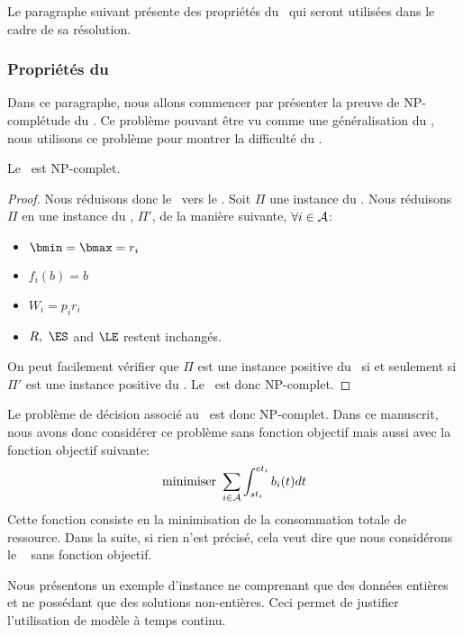 Le paragraphe suivant présente des propriétés du \CECSP~qui seront 
utilisées dans le cadre de sa résolution. 

\subsubsection{Propriétés du \CECSP}

Dans ce paragraphe, nous allons commencer par présenter la preuve de
NP-complétude du \CECSP. Ce problème pouvant être vu comme une
généralisation du \CUSP, nous utilisons ce problème pour montrer la
difficulté du \CECSP. 

\begin{theo}
Le \CECSP~est NP-complet.
\end{theo}

\begin{proof}
Nous réduisons donc le \CUSP~vers le \CECSP. Soit $\Pi$ une instance
du \CUSP. Nous réduisons $\Pi$ en une instance du \CECSP, $\Pi'$, de
la manière suivante, $\forall i \in {\cal A}$:
\begin{itemize}
\item $ \bmin=\bmax=r_i$
\item $f_i(b)=b$
\item $W_i=p_ir_i$
\item $R,\ \ES$ and $\LE$ restent inchangés. 
\end{itemize}

On peut facilement vérifier  que $\Pi$ est une instance positive du \CUSP~si
et seulement si $\Pi'$ est une instance positive du \CECSP. Le
\CECSP~est donc NP-complet.
\end{proof}

Le problème de décision associé au \CECSP~est donc NP-complet. Dans ce
manuscrit, nous avons donc considérer ce problème sans fonction
objectif mais aussi avec la fonction objectif suivante: 
\[\text{minimiser } \sum_{i \in {\cal A}} \int_{st_i}^{et_i} b_i(t)dt\]
Cette fonction consiste en la minimisation de la consommation totale
de ressource. Dans la suite, si rien n'est précisé, cela veut dire que
nous considérons le \CECSP~ sans fonction objectif.

Nous présentons un exemple d'instance ne comprenant que des données
entières et ne possédant que des solutions non-entières. Ceci permet
de justifier l'utilisation de modèle à temps continu.

